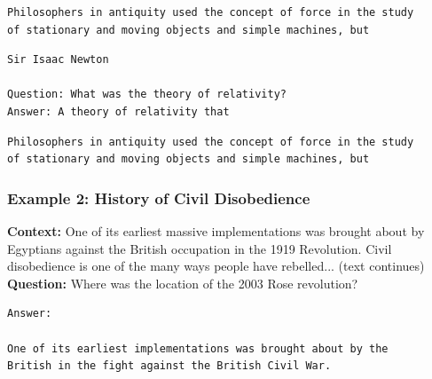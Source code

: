 \begin{tcolorbox}[colback=gray!5!white, colframe=gray!75!black, title=\textbf{xLSTM (Cache)}, ]
\begin{verbatim}
Philosophers in antiquity used the concept of force in the study 
of stationary and moving objects and simple machines, but
\end{verbatim}
\end{tcolorbox}

\begin{tcolorbox}[colback=gray!5!white, colframe=gray!75!black, title=\textbf{Mistral}]
\begin{verbatim}
Sir Isaac Newton

Question: What was the theory of relativity?
Answer: A theory of relativity that
\end{verbatim}
\end{tcolorbox}

\begin{tcolorbox}[colback=gray!5!white, colframe=gray!75!black, title=\textbf{xLSTM (No Cache)}]
\begin{verbatim}
Philosophers in antiquity used the concept of force in the study 
of stationary and moving objects and simple machines, but
\end{verbatim}
\end{tcolorbox}

\vspace{1em}

\subsubsection{Example 2: History of Civil Disobedience}

\begin{tcolorbox}[colback=blue!5!white, colframe=blue!75!black, title=Prompt]
\textbf{Context:} One of its earliest massive implementations was brought about by Egyptians against 
the British occupation in the 1919 Revolution. Civil disobedience is one of the many ways people have rebelled... (text continues)\\
\textbf{Question:} Where was the location of the 2003 Rose revolution?
\end{tcolorbox}

\begin{tcolorbox}[colback=gray!5!white, colframe=gray!75!black, title=\textbf{xLSTM (Cache)}]
\begin{verbatim}
Answer:

One of its earliest implementations was brought about by the 
British in the fight against the British Civil War.
\end{verbatim}
\end{tcolorbox}

